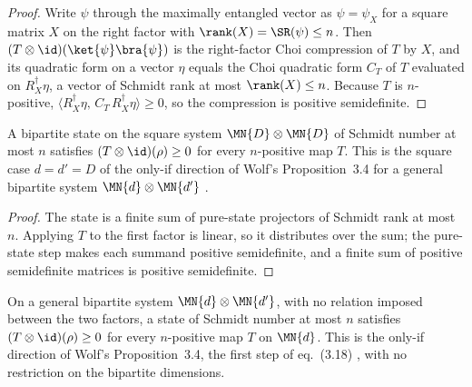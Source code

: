 \begin{proof}
    \leanok
    Write $\psi$ through the maximally entangled vector as $\psi=\psi_X$ for a square
    matrix $X$ on the right factor with
    $\rank(X)=\SR(\psi)\le n$. Then
    $(T\otimes\id)(\ket{\psi}\bra{\psi})$ is the right-factor Choi compression of $T$
    by $X$, and its quadratic form on a vector $\eta$ equals the Choi quadratic form
    $C_T$ of $T$ evaluated on $R_X^\dagger\eta$, a vector of Schmidt rank at most
    $\rank(X)\le n$. Because $T$ is $n$-positive,
    $\langle R_X^\dagger\eta,\, C_T\, R_X^\dagger\eta\rangle\ge 0$, so the
    compression is positive semidefinite.
\end{proof}

\begin{theorem}
    \label{thm:has_schmidt_number_le_tensor_map_id}
    \leanok
    A bipartite state on the square system $\MN{D}\otimes\MN{D}$ of Schmidt number at
    most $n$ satisfies $(T\otimes\id)(\rho)\ge 0$ for every $n$-positive map $T$.
    This is the square case $d=d'=D$ of the only-if direction of Wolf's
    Proposition~3.4 for a general bipartite system
    $\MN{d}\otimes\MN{d'}$ \cite[Chapter~3, Proposition~3.4]{Wolf2012Quantum}.
\end{theorem}

\begin{proof}
    \leanok
    The state is a finite sum of pure-state projectors of Schmidt rank at most $n$.
    Applying $T$ to the first factor is linear, so it distributes over the sum; the
    pure-state step makes each summand positive semidefinite, and a finite sum of
    positive semidefinite matrices is positive semidefinite.
\end{proof}

\begin{theorem}
    \label{thm:has_schmidt_number_le_tensor_map_id_general}
    \leanok
    On a general bipartite system $\MN{d}\otimes\MN{d'}$, with no relation imposed
    between the two factors, a state of Schmidt number at most $n$ satisfies
    $(T\otimes\id)(\rho)\ge 0$ for every $n$-positive map $T$ on $\MN{d}$.
    This is the only-if direction of Wolf's Proposition~3.4, the first step of
    eq.~(3.18) \cite[Chapter~3, Proposition~3.4]{Wolf2012Quantum}, with no restriction
    on the bipartite dimensions.
\end{theorem}

